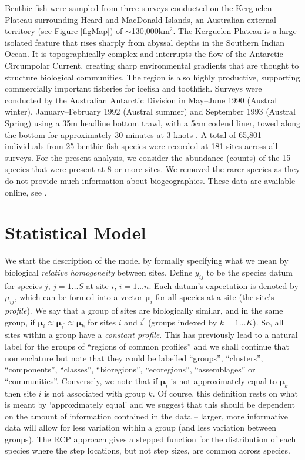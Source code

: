 \documentclass{statsoc}
\newcommand{\vm}{\bm{\mu}}
\begin{document}
Benthic fish were sampled from three surveys conducted on the Kerguelen Plateau surrounding Heard and MacDonald Islands, an Australian external territory (see Figure \ref{figMap}) of $\sim$130,000km$^2$. The Kerguelen Plateau is a large isolated feature that rises sharply from abyssal depths in the Southern Indian Ocean. It is topographically complex and interrupts the flow of the Antarctic Circumpolar Current, creating sharp environmental gradients that are thought to structure biological communities. The region is also highly productive, supporting commercially important fisheries for icefish and toothfish. Surveys were conducted by the Australian Antarctic Division in May--June 1990 (Austral winter), January--February 1992 (Austral summer) and September 1993 (Austral Spring) using a 35m headline bottom trawl, with a 5cm codend liner, towed along the bottom for approximately 30 minutes at 3 knots \citep{wil95}. A total of 65,801 individuals from 25 benthic fish species were recorded at 181 sites across all surveys. For the present analysis, we consider the abundance (counts) of the 15 species that were present at 8 or more sites. We removed the rarer species as they do not provide much information about biogeographies. These data are available online, see \citet{hil15}.

\section{Statistical Model}\label{s:model}

We start the description of the model by formally specifying what we mean by biological \textit{relative homogeneity} between sites. Define $y_{ij}$ to be the species datum for species $j$, $j=1\ldots S$ at site $i$, $i=1\ldots n$. Each datum's expectation is denoted by $\mu_{ij}$, which can be formed into a vector $\vm_i$ for all species at a site (the site's \textit{profile}). We say that a group of sites are biologically similar, and in the same group, if $\vm_i\approx\vm_{i^\prime}\approx\vm_k$ for sites $i$ and $i^\prime$ (groups indexed by $k=1\ldots K$). So, all sites within a group have a \textit{constant profile}. This has previously lead to a natural label for the groups of ``regions of common profiles'' \citep[RCPs;][]{fos13,lyo15} and we shall continue that nomenclature but note that they could be labelled ``groups'', ``clusters'', ``components'', ``classes'', ``bioregions'', ``ecoregions'', ``assemblages'' or ``communities''. Conversely, we note that if $\vm_i$ is not approximately equal to $\vm_k$ then site $i$ is not associated with group $k$. Of course, this definition rests on what is meant by `approximately equal' and we suggest that this should be dependent on the amount of information contained in the data -- larger, more informative data will allow for less variation within a group (and less variation between groups). The RCP approach gives a stepped function for the distribution of each species where the step locations, but not step sizes, are common across species.
\end{document}

